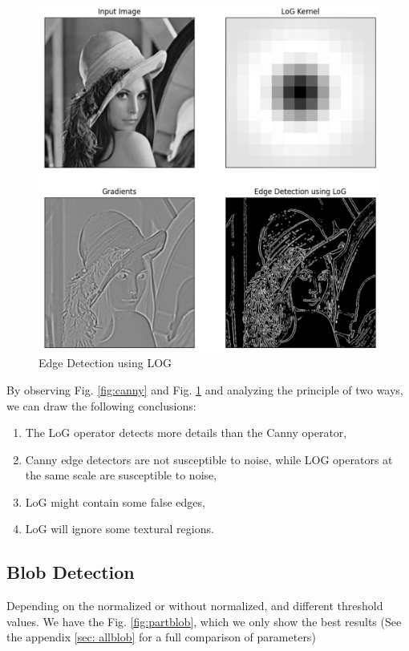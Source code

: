 \documentclass[final]{cvpr}
\begin{document}
\begin{figure}[htbp]
\centering

\includegraphics[width=0.7\linewidth]{11.png}

\caption{Edge Detection using LOG}
\label{fig: log}
\end{figure}

By observing Fig. \ref{fig:canny} and Fig. \ref{fig: log} and analyzing the principle of two ways, we can draw the following conclusions:

\begin{enumerate}
\item The LoG operator detects more details than the Canny operator,
\item Canny edge detectors are not susceptible to noise, while LOG operators at the same scale are susceptible to noise,
\item LoG might contain some false edges,
\item LoG will ignore some textural regions.
\end{enumerate}

\subsection{Blob Detection}
Depending on the normalized or without normalized, and different threshold values. We have the Fig. \ref{fig:partblob}, which we only show the best results (See the appendix \ref{sec: allblob} for a full comparison of parameters)
\end{document}
